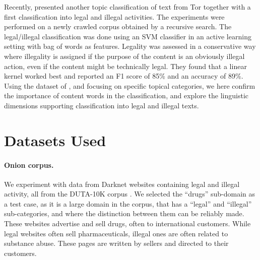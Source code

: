 \documentclass[11pt,a4paper,table]{article}
\begin{document}
Recently, \citet{Avarikioti18} presented another topic classification of text from Tor together with a first classification into legal and illegal activities.  The experiments were performed on a newly crawled corpus obtained by a recursive search. The legal/illegal classification was done using an SVM classifier in an active learning setting with bag of words as features. Legality was assessed in a conservative way where illegality is assigned if the purpose of the content is an obviously illegal action, even if the content might be technically legal. They found that a linear kernel worked best and reported an F1 score of 85\% and an accuracy of 89\%. Using the dataset of \citet{AlNabki19}, and focusing on specific topical categories, we here confirm the importance of content words in the classification, and explore the linguistic dimensions supporting classification into legal and illegal texts. 



\section{Datasets Used}\label{sec:datasets}

\paragraph{Onion corpus.}
We experiment with data from Darknet websites containing
legal and illegal activity, all from the DUTA-10K corpus \citep{AlNabki19}.
We selected the ``drugs'' sub-domain as a test case, as it is a large domain in the corpus,
that has a ``legal'' and ``illegal'' sub-categories, and where the distinction between them 
can  be reliably made.
These websites advertise and sell
drugs, often to international customers.
While legal websites often sell pharmaceuticals,
illegal ones are often related to substance abuse.
These pages are written by sellers and directed to their customers.
  
\end{document}
